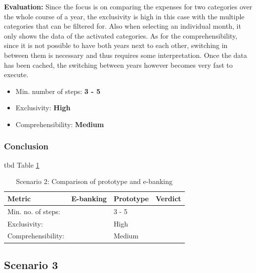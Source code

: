 \textbf{Evaluation:} Since the focus is on comparing the expenses for two categories over the whole course of a year, the exclusivity is high in this case with the multiple categories that can be filtered for. Also when selecting an individual month, it only shows the data of the activated categories. As for the comprehensibility, since it is not possible to have both years next to each other, switching in between them is necessary and thus requires some interpretation. Once the data has been cached, the switching between years however becomes very fast to execute.
\begin{itemize}[noitemsep,nolistsep]
	\item Min. number of steps: \textbf{3 - 5}
	\item Exclusivity: \textbf{High}
	\item Comprehensibility: \textbf{Medium}
\end{itemize}



\subsubsection{Conclusion}

tbd Table \ref{tbl:scenariotwocomparison}

\begin{table}[t]
	\begin{center}
		\begin{tabular}{ | p{3.5cm} | p{3cm} | p{3cm} | p{3cm} | } 
			\hline
			\textbf{Metric} & \textbf{E-banking} & \textbf{Prototype} & \textbf{Verdict} \\
			\hline
			Min. no. of steps: &  & 3 - 5 &  \\
			\hline
			Exclusivity: &  & High &  \\
			\hline
			Comprehensibility: &  & Medium &  \\
			\hline
		\end{tabular}
		\caption{Scenario 2: Comparison of prototype and e-banking}
		\label{tbl:scenariotwocomparison}
	\end{center}
\end{table}



\subsection{Scenario 3}

